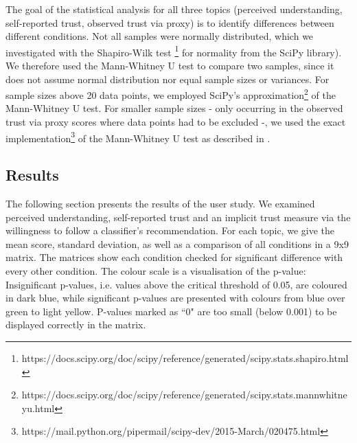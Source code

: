 The goal of the statistical analysis for all three topics (perceived understanding, self-reported trust, observed trust via proxy) is to identify differences between different conditions. Not all samples were normally distributed, which we investigated with the Shapiro-Wilk test \footnote{https://docs.scipy.org/doc/scipy/reference/generated/scipy.stats.shapiro.html} for normality from the SciPy library). We therefore used the Mann-Whitney U test to compare two samples, since it does not assume normal distribution nor equal sample sizes or variances. For sample sizes above 20 data points, we employed SciPy's approximation\footnote{https://docs.scipy.org/doc/scipy/reference/generated/scipy.stats.mannwhitneyu.html} of the Mann-Whitney U test. For smaller sample sizes - only occurring in the observed trust via proxy scores where data points had to be excluded -, we used the exact implementation\footnote{https://mail.python.org/pipermail/scipy-dev/2015-March/020475.html} of the Mann-Whitney U test as described in \cite{cheung1997mann}.


\subsection{Results}
The following section presents the results of the user study. We examined perceived understanding, self-reported trust and an implicit trust measure via the willingness to follow a classifier's recommendation. For each topic, we give the mean score, standard deviation, as well as a comparison of all conditions in a 9x9 matrix.\newline
The matrices show each condition checked for significant difference with every other condition. The colour scale is a visualisation of the p-value: Insignificant p-values, i.e. values above the critical threshold of 0.05, are coloured in dark blue, while significant p-values are presented with colours from blue over green to light yellow. P-values marked as ``0" are too small (below 0.001) to be displayed correctly in the matrix.\newline 

